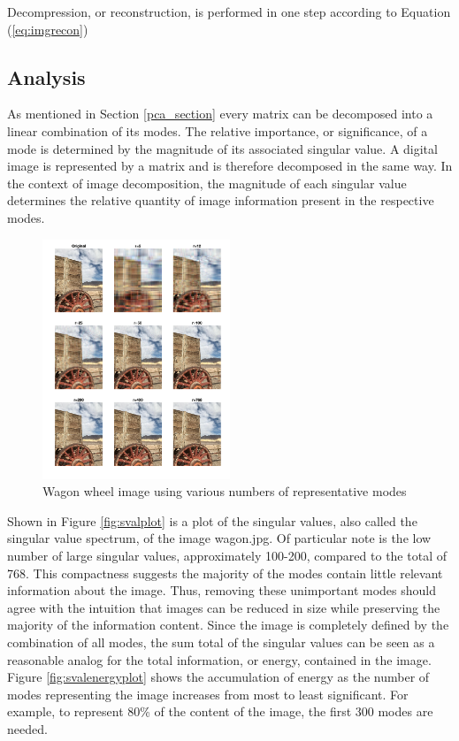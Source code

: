 \documentclass[conference]{IEEEtran}
\begin{document}
    Decompression, or reconstruction, is performed in one step according to Equation (\ref{eq:imgrecon})
    
    \subsection{Analysis}
    As mentioned in Section \ref{pca_section} every matrix can be decomposed into a linear combination of its modes. The relative importance, or significance, of a mode is determined by the magnitude of its associated singular value. A digital image is represented by a matrix and is therefore decomposed in the same way. In the context of image decomposition, the magnitude of each singular value determines the relative quantity of image information present in the respective modes.
    
    \begin{figure}[t]
        \includegraphics[width=0.5\textwidth]{show_different_r_wagon}
        \caption{Wagon wheel image using various numbers of representative modes}
        \label{fig:showwagondiffr}
    \end{figure}
    
    Shown in Figure \ref{fig:svalplot} is a plot of the singular values, also called the singular value spectrum, of the image wagon.jpg. Of particular note is the low number of large singular values, approximately 100-200, compared to the total of 768. This compactness suggests the majority of the modes contain little relevant information about the image. Thus, removing these unimportant modes should agree with the intuition that images can be reduced in size while preserving the majority of the information content. Since the image is completely defined by the combination of all modes, the sum total of the singular values can be seen as a reasonable analog for the total information, or energy, contained in the image. Figure \ref{fig:svalenergyplot} shows the accumulation of energy as the number of modes representing the image increases from most to least significant. For example, to represent 80\% of the content of the image, the first 300 modes are needed.
\end{document}
